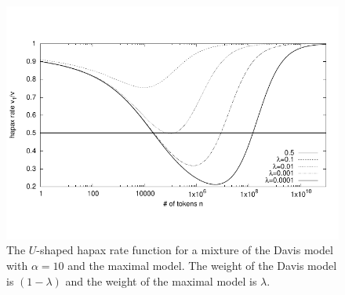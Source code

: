 \documentclass[a4paper,12pt]{article}
\begin{document}
\begin{figure}[t]
  \centering
  \includegraphics[width=\columnwidth]{output/token_ratio.pdf}
  \caption{The $U$-shaped hapax rate function for a mixture of the
    Davis model with $\alpha=10$ and the maximal model. The weight of
    the Davis model is $(1-\lambda)$ and the weight of the maximal
    model is $\lambda$. \label{figHapaxU}}
\end{figure}
\end{document}
